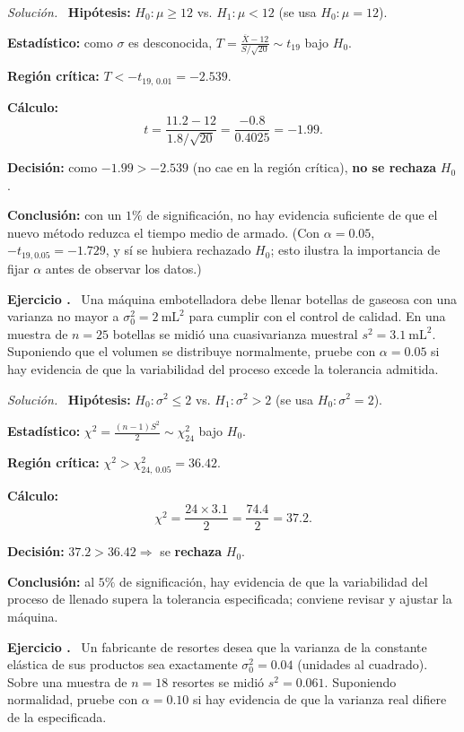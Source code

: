 \documentclass[11pt,a4paper]{article}
\newcounter{ejnum}
\newenvironment{ejercicio}{\refstepcounter{ejnum}\par\medskip\noindent\textbf{Ejercicio \theejnum.}~}{\par}
\newenvironment{solucion}{\par\noindent\textit{Solución.}~}{\par\vspace{1em}}
\begin{document}
\begin{solucion}
\textbf{Hipótesis:} $H_0:\mu\ge12$ vs. $H_1:\mu<12$ (se usa $H_0:\mu=12$).

\textbf{Estadístico:} como $\sigma$ es desconocida, $\displaystyle T=\frac{\overline{X}-12}{S/\sqrt{20}}\sim t_{19}$ bajo $H_0$.

\textbf{Región crítica:} $T<-t_{19,\,0.01}=-2.539$.

\textbf{Cálculo:}
\[
t=\frac{11.2-12}{1.8/\sqrt{20}}=\frac{-0.8}{0.4025}=-1.99.
\]

\textbf{Decisión:} como $-1.99>-2.539$ (no cae en la región crítica), \textbf{no se rechaza} $H_0$.

\textbf{Conclusión:} con un $1\%$ de significación, no hay evidencia suficiente de que el nuevo método reduzca el tiempo medio de armado. (Con $\alpha=0.05$, $-t_{19,0.05}=-1.729$, y sí se hubiera rechazado $H_0$; esto ilustra la importancia de fijar $\alpha$ antes de observar los datos.)
\end{solucion}

\begin{ejercicio}
Una máquina embotelladora debe llenar botellas de gaseosa con una varianza no mayor a $\sigma_0^2=2\ \text{mL}^2$ para cumplir con el control de calidad. En una muestra de $n=25$ botellas se midió una cuasivarianza muestral $s^2=3.1\ \text{mL}^2$. Suponiendo que el volumen se distribuye normalmente, pruebe con $\alpha=0.05$ si hay evidencia de que la variabilidad del proceso excede la tolerancia admitida.
\end{ejercicio}

\begin{solucion}
\textbf{Hipótesis:} $H_0:\sigma^2\le2$ vs. $H_1:\sigma^2>2$ (se usa $H_0:\sigma^2=2$).

\textbf{Estadístico:} $\displaystyle \chi^2=\frac{(n-1)S^2}{2}\sim\chi^2_{24}$ bajo $H_0$.

\textbf{Región crítica:} $\chi^2>\chi^2_{24,\,0.05}=36.42$.

\textbf{Cálculo:}
\[
\chi^2=\frac{24\times3.1}{2}=\frac{74.4}{2}=37.2.
\]

\textbf{Decisión:} $37.2>36.42\Rightarrow$ se \textbf{rechaza} $H_0$.

\textbf{Conclusión:} al $5\%$ de significación, hay evidencia de que la variabilidad del proceso de llenado supera la tolerancia especificada; conviene revisar y ajustar la máquina.
\end{solucion}

\begin{ejercicio}
Un fabricante de resortes desea que la varianza de la constante elástica de sus productos sea exactamente $\sigma_0^2=0.04$ (unidades al cuadrado). Sobre una muestra de $n=18$ resortes se midió $s^2=0.061$. Suponiendo normalidad, pruebe con $\alpha=0.10$ si hay evidencia de que la varianza real difiere de la especificada.
\end{ejercicio}
\end{document}
